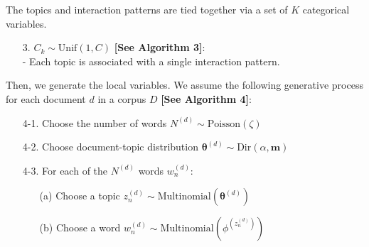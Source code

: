 \documentclass[a4paper]{article}
\begin{document}
\noindent The topics and interaction patterns are tied together via a set of $K$ categorical variables.
\begin{itemize}
	\item[3.] $C_k\sim \mbox{Unif}(1, C)$ \textbf{[See Algorithm 3]}: \\
	- Each topic is associated with a single interaction pattern.\\
\end{itemize}
\noindent Then, we generate the local variables. We assume the following generative process for each document $d$ in a corpus $D$ \textbf{[See Algorithm 4]}:
\begin{itemize}
	\item[4-1.] Choose the number of words $N^{(d)} \sim \mbox{Poisson}(\zeta)$
	\item[4-2.] Choose document-topic distribution $\boldsymbol{\theta}^{(d)}\sim \mbox{Dir}(\alpha, \boldsymbol{m})$
	\item[4-3.] For each of the $N^{(d)}$ words $w_n^{(d)}$:
	\begin{itemize}
		\item[(a)] Choose a topic $z_n^{(d)} \sim \mbox{Multinomial}(\boldsymbol{\theta}^{(d)})$
		\item[(b)] Choose a word $w_n^{(d)} \sim\mbox{Multinomial} (\phi^{(z_n^{(d)})})$
	\end{itemize}
\end{itemize}
\end{document}
